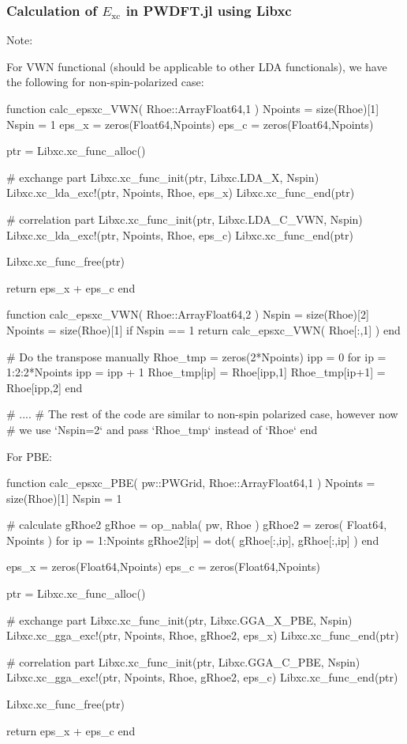 \subsubsection{Calculation of $E_{\mathrm{xc}}$ in \textsf{PWDFT.jl} using Libxc}

Note:

For VWN functional (should be applicable to other LDA functionals), we have the following
for non-spin-polarized case:
%
\begin{juliacode}
function calc_epsxc_VWN( Rhoe::Array{Float64,1} )
    Npoints = size(Rhoe)[1]
    Nspin = 1
    eps_x = zeros(Float64,Npoints)
    eps_c = zeros(Float64,Npoints)

    ptr = Libxc.xc_func_alloc()

    # exchange part
    Libxc.xc_func_init(ptr, Libxc.LDA_X, Nspin)
    Libxc.xc_lda_exc!(ptr, Npoints, Rhoe, eps_x)
    Libxc.xc_func_end(ptr)

    # correlation part
    Libxc.xc_func_init(ptr, Libxc.LDA_C_VWN, Nspin)
    Libxc.xc_lda_exc!(ptr, Npoints, Rhoe, eps_c)
    Libxc.xc_func_end(ptr)

    Libxc.xc_func_free(ptr)

    return eps_x + eps_c
end
\end{juliacode}


\begin{juliacode}
function calc_epsxc_VWN( Rhoe::Array{Float64,2} )
    Nspin = size(Rhoe)[2]
    Npoints = size(Rhoe)[1]
    if Nspin == 1
        return calc_epsxc_VWN( Rhoe[:,1] )
    end

    # Do the transpose manually
    Rhoe_tmp = zeros(2*Npoints)
    ipp = 0
    for ip = 1:2:2*Npoints
        ipp = ipp + 1
        Rhoe_tmp[ip] = Rhoe[ipp,1]
        Rhoe_tmp[ip+1] = Rhoe[ipp,2]
    end

    # ....
    # The rest of the code are similar to non-spin polarized case, however now
    # we use `Nspin=2` and pass `Rhoe_tmp` instead of `Rhoe`
end
\end{juliacode}

For PBE:
\begin{juliacode}
function calc_epsxc_PBE( pw::PWGrid, Rhoe::Array{Float64,1} )
    Npoints = size(Rhoe)[1]
    Nspin = 1

    # calculate gRhoe2
    gRhoe = op_nabla( pw, Rhoe )
    gRhoe2 = zeros( Float64, Npoints )
    for ip = 1:Npoints
        gRhoe2[ip] = dot( gRhoe[:,ip], gRhoe[:,ip] )
    end

    eps_x = zeros(Float64,Npoints)
    eps_c = zeros(Float64,Npoints)

    ptr = Libxc.xc_func_alloc()

    # exchange part
    Libxc.xc_func_init(ptr, Libxc.GGA_X_PBE, Nspin)
    Libxc.xc_gga_exc!(ptr, Npoints, Rhoe, gRhoe2, eps_x)
    Libxc.xc_func_end(ptr)

    # correlation part
    Libxc.xc_func_init(ptr, Libxc.GGA_C_PBE, Nspin)
    Libxc.xc_gga_exc!(ptr, Npoints, Rhoe, gRhoe2, eps_c)
    Libxc.xc_func_end(ptr)

    Libxc.xc_func_free(ptr)

    return eps_x + eps_c
end
\end{juliacode}

